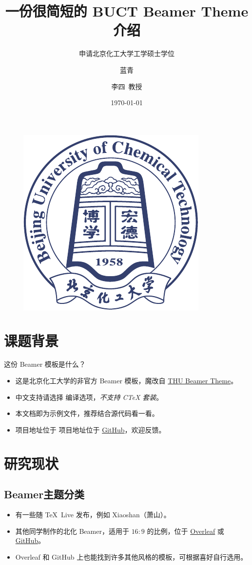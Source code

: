 \documentclass[no-math]{ctexbeamer}
\author[蓝青]{蓝青 \and 李四~教授}
\title{一份很简短的 BUCT Beamer Theme 介绍}
\subtitle{申请北京化工大学工学硕士学位}
\institute[CMSE of BUCT]{北京化工大学\quad 材料科学与工程学院}
\date{\today}
\begin{document}
\begin{frame}
	\titlepage
	\begin{figure}[htpb]
		\begin{center}
			\includegraphics[width=0.15\linewidth]{pic/BUCT-badge.pdf}
		\end{center}
	\end{figure}
\end{frame}

\begin{frame}
	\tableofcontents[sectionstyle=show,subsectionstyle=show/shaded/hide,subsubsectionstyle=show/shaded/hide]
\end{frame}


\section{课题背景}

\begin{frame}{这份 Beamer 模板是什么？}
	\begin{itemize}[<+-| alert@+>] %
		\item 这是北京化工大学的非官方 Beamer 模板，魔改自 \href{https://www.overleaf.com/latex/templates/thu-beamer-theme/vwnqmzndvwyb}{THU Beamer Theme}。
		\item 中文支持请选择 \XeLaTeX 编译选项，\emph{不支持 CTeX 套装}。
		\item 本文档即为示例文件，推荐结合源代码看一看。
		\item 项目地址位于 项目地址位于 \href{https://github.com/Miracle0565/buct-Beamer-Theme}{GitHub}，欢迎反馈。
	\end{itemize}
\end{frame}


\section{研究现状}

\subsection{Beamer主题分类}

\begin{frame}
	\begin{itemize}
		\item 有一些随 \TeX\ Live 发布，例如 Xiaoshan（萧山）。\pause
		\item 其他同学制作的北化 Beamer，适用于 $16:9$ 的比例，位于 \href{https://cn.overleaf.com/latex/templates/beamer-for-buct/rndypbwvfxrp}{Overleaf} 或 \href{https://github.com/Livioni/Beamer-Temlate-for-BUCT}{GitHub}。\pause
		\item Overleaf 和 GitHub 上也能找到许多其他风格的模板，可根据喜好自行选用。
	\end{itemize}
\end{frame}
\end{document}
